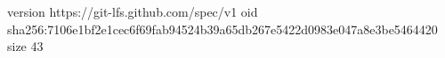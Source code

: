 version https://git-lfs.github.com/spec/v1
oid sha256:7106e1bf2e1cec6f69fab94524b39a65db267e5422d0983e047a8e3be5464420
size 43
